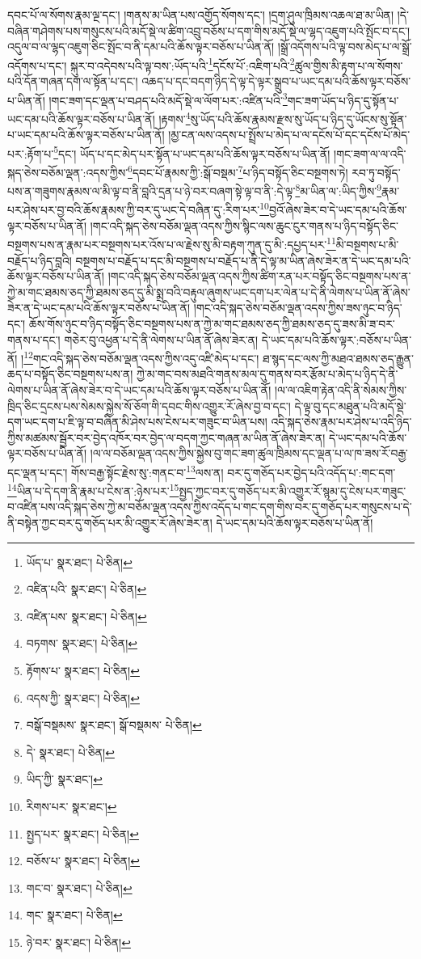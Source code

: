 དབང་པོ་ལ་སོགས་རྣམ་ལྔ་དང་། །གནས་མ་ཡིན་པས་འགྱོད་སོགས་དང་། །དྲག་ཤུལ་ཁྲིམས་འཆལ་ཐ་མ་ཡིན། །དེ་བཞིན་གཤེགས་པས་གསུངས་པའི་མདོ་སྡེ་ལ་ཚིག་འབྲུ་བཅོས་པ་དག་གིས་མདོ་སྡེ་ལ་ལྷད་འཇུག་པའི་སྤོང་བ་དང་། འདུལ་བ་ལ་ལྷད་འཇུག་ཅིང་སྤོང་བ་ནི་དམ་པའི་ཆོས་ལྟར་བཅོས་པ་ཡིན་ནོ། །སྒྲོ་འདོགས་པའི་ལྟ་བས་མེད་པ་ལ་སྒྲོ་འདོགས་པ་དང་། སྐུར་བ་འདེབས་པའི་ལྟ་བས་:ཡོད་པའི་\footnote{ཡོད་པ་  སྣར་ཐང་།  པེ་ཅིན། }དངོས་པོ་:འཇིག་པའི་\footnote{འཛིན་པའི་  སྣར་ཐང་།  པེ་ཅིན། }ཚུལ་གྱིས་མི་རྟག་པ་ལ་སོགས་པའི་དོན་གཞན་དག་ལ་སྟོན་པ་དང་། འཆད་པ་དང་བདག་ཉིད་དེ་ལྟ་དེ་ལྟར་སྒྲུབ་པ་ཡང་དམ་པའི་ཆོས་ལྟར་བཅོས་པ་ཡིན་ནོ། །གང་ཟག་དང་ལྡན་པ་བཤད་པའི་མདོ་སྡེ་ལ་ལོག་པར་:འཛིན་པའི་\footnote{འཛིན་པས་  སྣར་ཐང་།  པེ་ཅིན། }གང་ཟག་ཡོད་པ་ཉིད་དུ་སྟོན་པ་ཡང་དམ་པའི་ཆོས་ལྟར་བཅོས་པ་ཡིན་ནོ། །རྟགས་\footnote{བཏགས་  སྣར་ཐང་།  པེ་ཅིན། }སུ་ཡོད་པའི་ཆོས་རྣམས་རྫས་སུ་ཡོད་པ་ཉིད་དུ་ཡོངས་སུ་སྟོན་པ་ཡང་དམ་པའི་ཆོས་ལྟར་བཅོས་པ་ཡིན་ནོ། །མྱ་ངན་ལས་འདས་པ་སྤྲོས་པ་མེད་པ་ལ་དངོས་པོ་དང་དངོས་པོ་མེད་པར་:རྟོག་པ་\footnote{རྟོགས་པ་  སྣར་ཐང་།  པེ་ཅིན། }དང་། ཡོད་པ་དང་མེད་པར་སྟོན་པ་ཡང་དམ་པའི་ཆོས་ལྟར་བཅོས་པ་ཡིན་ནོ། །གང་ཟག་ལ་ལ་འདི་སྐད་ཅེས་བཅོམ་ལྡན་:འདས་ཀྱིས་\footnote{འདས་ཀྱི་  སྣར་ཐང་།  པེ་ཅིན། }དབང་པོ་རྣམས་ཀྱི་:སྒོ་བསྡམ་\footnote{བསྒོ་བསྡམས་  སྣར་ཐང་། སྒོ་བསྡམས་  པེ་ཅིན། }པ་ཉིད་བསྟོད་ཅིང་བསྔགས་ཏེ། རབ་ཏུ་བསྟོད་པས་ན་གཟུགས་རྣམས་ལ་མི་ལྟ་བ་ནི་བླའི་དྲན་པ་ཉེ་བར་བཞག་སྟེ་ལྟ་བ་ནི་:དེ་ལྟ་\footnote{དེ་  སྣར་ཐང་།  པེ་ཅིན། }མ་ཡིན་ལ་:ཡིད་ཀྱིས་\footnote{ཡིད་ཀྱི་  སྣར་ཐང་། }རྣམ་པར་ཤེས་པར་བྱ་བའི་ཆོས་རྣམས་ཀྱི་བར་དུ་ཡང་དེ་བཞིན་དུ་:རིག་པར་\footnote{རིགས་པར་  སྣར་ཐང་། }བྱའོ་ཞེས་ཟེར་བ་དེ་ཡང་དམ་པའི་ཆོས་ལྟར་བཅོས་པ་ཡིན་ནོ། །གང་འདི་སྐད་ཅེས་བཅོམ་ལྡན་འདས་ཀྱིས་སྙིང་ལས་ཆུང་ངུར་གནས་པ་ཉིད་བསྟོད་ཅིང་བསྔགས་པས་ན་རྣམ་པར་བསྔགས་པར་འོས་པ་ལ་རྗེས་སུ་མི་བརྟག་ཀུན་དུ་མི་:དཔྱད་པར་\footnote{སྤྱད་པར་  སྣར་ཐང་།  པེ་ཅིན། }མི་བསྔགས་པ་མི་བརྗོད་པ་ཉིད་བླའི། བསྔགས་པ་བརྗོད་པ་དང་མི་བསྔགས་པ་བརྗོད་པ་ནི་དེ་ལྟ་མ་ཡིན་ཞེས་ཟེར་ན་དེ་ཡང་དམ་པའི་ཆོས་ལྟར་བཅོས་པ་ཡིན་ནོ། །གང་འདི་སྐད་ཅེས་བཅོམ་ལྡན་འདས་ཀྱིས་ཚིག་རན་པར་བསྟོད་ཅིང་བསྔགས་པས་ན་ཀྱེ་མ་གང་ཐམས་ཅད་ཀྱི་ཐམས་ཅད་དུ་མི་སྨྲ་བའི་བརྟུལ་ཞུགས་ཡང་དག་པར་ལེན་པ་དེ་ནི་ལེགས་པ་ཡིན་ནོ་ཞེས་ཟེར་ན་དེ་ཡང་དམ་པའི་ཆོས་ལྟར་བཅོས་པ་ཡིན་ནོ། །གང་འདི་སྐད་ཅེས་བཅོམ་ལྡན་འདས་ཀྱིས་ཟས་ཉུང་བ་ཉིད་དང་། ཆོས་གོས་ཉུང་བ་ཉིད་བསྟོད་ཅིང་བསྔགས་པས་ན་ཀྱེ་མ་གང་ཐམས་ཅད་ཀྱི་ཐམས་ཅད་དུ་ཟས་མི་ཟ་བར་གནས་པ་དང་། གཅེར་བུ་འཕྱན་པ་དེ་ནི་ལེགས་པ་ཡིན་ནོ་ཞེས་ཟེར་ན། དེ་ཡང་དམ་པའི་ཆོས་ལྟར་:བཅོས་པ་ཡིན་ནོ། །\footnote{བཅོས་པ་  སྣར་ཐང་།  པེ་ཅིན། }གང་འདི་སྐད་ཅེས་བཅོམ་ལྡན་འདས་ཀྱིས་འདུ་འཛི་མེད་པ་དང་། ཐ་སྙད་དང་ལས་ཀྱི་མཐའ་ཐམས་ཅད་རྒྱུན་ཆད་པ་བསྟོད་ཅིང་བསྔགས་པས་ན། ཀྱེ་མ་གང་བས་མཐའི་གནས་མལ་དུ་གནས་བར་རྩོམ་པ་མེད་པ་ཉིད་དེ་ནི་ལེགས་པ་ཡིན་ནོ་ཞེས་ཟེར་བ་དེ་ཡང་དམ་པའི་ཆོས་ལྟར་བཅོས་པ་ཡིན་ནོ། །ལ་ལ་འཇིག་རྟེན་འདི་ནི་སེམས་ཀྱིས་ཁྲིད་ཅིང་དྲངས་པས་སེམས་སྐྱེས་སོ་ཅོག་གི་དབང་གིས་འགྱུར་རོ་ཞེས་བྱ་བ་དང་། དེ་ལྟ་བུ་དང་མཐུན་པའི་མདོ་སྡེ་དག་ཡང་དག་པ་ཇི་ལྟ་བ་བཞིན་མི་ཤེས་པས་ངེས་པར་གཟུང་བ་ཡིན་པས། འདི་སྐད་ཅེས་རྣམ་པར་ཤེས་པ་འདི་ཉིད་ཀྱིས་མཚམས་སྦྱོར་བར་བྱེད་འཁོར་བར་བྱེད་ལ་བདག་ཀྱང་གཞན་མ་ཡིན་ནོ་ཞེས་ཟེར་ན། དེ་ཡང་དམ་པའི་ཆོས་ལྟར་བཅོས་པ་ཡིན་ནོ། །ལ་ལ་བཅོམ་ལྡན་འདས་ཀྱིས་སྐྱེས་བུ་གང་ཟག་ཚུལ་ཁྲིམས་དང་ལྡན་པ་ལ་ཁ་ཟས་རོ་བརྒྱ་དང་ལྡན་པ་དང་། གོས་བརྒྱ་སྟོང་རྗེས་སུ་:གནང་བ་\footnote{གང་བ་  སྣར་ཐང་།  པེ་ཅིན། }ལས་ན། བར་དུ་གཅོད་པར་བྱེད་པའི་འདོད་པ་:གང་དག་\footnote{གང་  སྣར་ཐང་།  པེ་ཅིན། }ཡིན་པ་དེ་དག་ནི་རྣམ་པ་ངེས་ན་:ཉེས་པར་\footnote{ཉེ་བར་  སྣར་ཐང་།  པེ་ཅིན། }སྤྱད་ཀྱང་བར་དུ་གཅོད་པར་མི་འགྱུར་རོ་སྙམ་དུ་ངེས་པར་གཟུང་བ་འཛིན་པས་འདི་སྐད་ཅེས་ཀྱེ་མ་བཅོམ་ལྡན་འདས་ཀྱིས་འདོད་པ་གང་དག་གིས་བར་དུ་གཅོད་པར་གསུངས་པ་དེ་ནི་བསྟེན་ཀྱང་བར་དུ་གཅོད་པར་མི་འགྱུར་རོ་ཞེས་ཟེར་ན། དེ་ཡང་དམ་པའི་ཆོས་ལྟར་བཅོས་པ་ཡིན་ནོ། 
